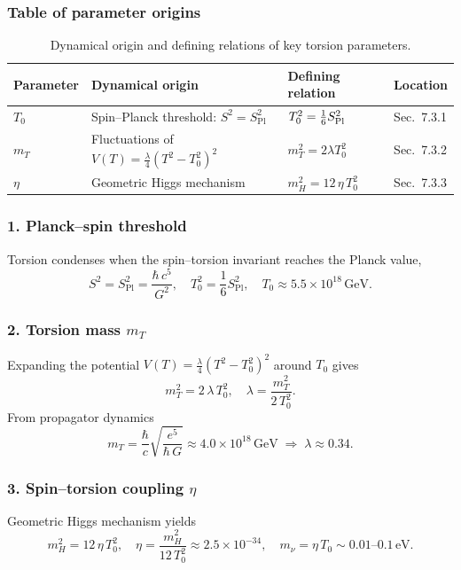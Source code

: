 \documentclass{article}
\newcommand{\Splanck}{S_{\mathrm{Pl}}}
\begin{document}
\subsubsection*{Table of parameter origins}
\begin{table}[h]
\centering
\begin{tabular}{|l|l|l|l|}
\hline
\textbf{Parameter} & \textbf{Dynamical origin} & \textbf{Defining relation} & \textbf{Location} \\
\hline
$T_{0}$ & Spin–Planck threshold: $S^2 = \Splanck^2$ & $T_0^2=\tfrac16S_{\rm Pl}^2$ & Sec.~7.3.1 \\
\hline
$m_{T}$ & Fluctuations of $V(T)=\tfrac\lambda4(T^2-T_0^2)^2$ & $m_T^2=2\lambda T_0^2$ & Sec.~7.3.2 \\
\hline
$\eta$ & Geometric Higgs mechanism & $m_H^2=12\,\eta\,T_0^2$ & Sec.~7.3.3 \\
\hline
\end{tabular}
\caption{Dynamical origin and defining relations of key torsion parameters.}
\end{table}

\medskip

\subsubsection*{1. Planck–spin threshold}
Torsion condenses when the spin–torsion invariant reaches the Planck value,
\[
  S^2 = \Splanck^2 = \frac{\hbar\,c^5}{G^2},
  \quad
  T_0^2 = \frac{1}{6}\Splanck^2,
  \quad
  T_0\approx5.5\times10^{18}\,\mathrm{GeV}.
\]

\subsubsection*{2. Torsion mass $m_T$}
Expanding the potential $V(T)=\tfrac\lambda4(T^2-T_0^2)^2$ around $T_0$ gives
\[
  m_T^2 = 2\,\lambda\,T_0^2,
  \quad
  \lambda = \frac{m_T^2}{2\,T_0^2}.
\]
From propagator dynamics
\[
  m_T = \frac{\hbar}{c}\sqrt{\frac{e^5}{\hbar\,G}}
      \approx4.0\times10^{18}\,\mathrm{GeV}
  \;\Longrightarrow\;
  \lambda\approx0.34.
\]

\subsubsection*{3. Spin–torsion coupling $\eta$}
Geometric Higgs mechanism yields
\[
  m_H^2 = 12\,\eta\,T_0^2,
  \quad
  \eta = \frac{m_H^2}{12\,T_0^2}
       \approx2.5\times10^{-34},
  \quad
  m_\nu = \eta\,T_0 \sim0.01\text{–}0.1\,\mathrm{eV}.
\]
\end{document}
